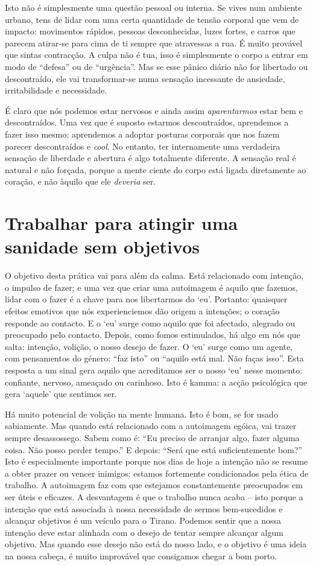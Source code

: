 Isto não é simplesmente uma questão pessoal ou interna. Se vives num
ambiente urbano, tens de lidar com uma certa quantidade de tensão
corporal que vem de impacto: movimentos rápidos, pessoas desconhecidas,
luzes fortes, e carros que parecem atirar-se para cima de ti sempre que
atravessas a rua. É muito provável que sintas contracção. A culpa não é
tua, isso é simplesmente o corpo a entrar em modo de “defesa” ou de
“urgência”. Mas se esse pânico diário não for libertado ou descontraído,
ele vai transformar-se numa sensação incessante de ansiedade,
irritabilidade e necessidade.

É claro que nós podemos estar nervosos e ainda assim \emph{aparentarmos}
estar bem e descontraídos. Uma vez que é suposto estarmos descontraídos,
aprendemos a fazer isso mesmo: aprendemos a adoptar posturas corporais
que nos fazem parecer descontraídos e \emph{cool}. No entanto, ter
internamente uma verdadeira sensação de liberdade e abertura é algo
totalmente diferente. A sensação real é natural e não forçada, porque a
mente ciente do corpo está ligada diretamente ao coração, e não àquilo
que ele \emph{deveria} ser.

\section{Trabalhar para atingir uma sanidade sem
objetivos}

O objetivo desta prática vai para além da calma. Está relacionado com
intenção, o impulso de fazer; e uma vez que criar uma autoimagem é
aquilo que fazemos, lidar com o fazer é a chave para nos libertarmos do
`eu'. Portanto: quaisquer efeitos emotivos que nós experienciemos dão
origem a intenções; o coração responde ao contacto. E o `eu' surge como
aquilo que foi afectado, alegrado ou preocupado pelo contacto. Depois,
como fomos estimulados, há algo em nós que salta: intenção, volição, o
nosso desejo de fazer. O `eu' surge como um agente, com pensamentos do
género: “faz isto” ou “aquilo está mal. Não faças isso”. Esta resposta a
um sinal gera aquilo que acreditamos ser o nosso `eu' nesse momento:
confiante, nervoso, ameaçado ou carinhoso. Isto é kamma: a acção
psicológica que gera `aquele' que sentimos ser.

Há muito potencial de volição na mente humana. Isto é bom, se for usado
sabiamente. Mas quando está relacionado com a autoimagem egóica, vai
trazer sempre desassossego. Sabem como é: “Eu preciso de arranjar algo,
fazer alguma coisa. Não posso perder tempo.” E depois: “Será que está
suficientemente bom?” Isto é especialmente importante porque nos dias de
hoje a intenção não se resume a obter prazer ou vencer inimigos: estamos
fortemente condicionados pela ética de trabalho. A autoimagem faz com
que estejamos constantemente preocupados em ser úteis e eficazes. A
desvantagem é que o trabalho nunca acaba -- isto porque a intenção que
está associada à nossa necessidade de sermos bem-sucedidos e alcançar
objetivos é um veículo para o Tirano. Podemos sentir que a nossa
intenção deve estar alinhada com o desejo de tentar sempre alcançar
algum objetivo. Mas quando esse desejo não está do nosso lado, e o
objetivo é uma ideia na nossa cabeça, é muito improvável que consigamos
chegar a bom porto.

